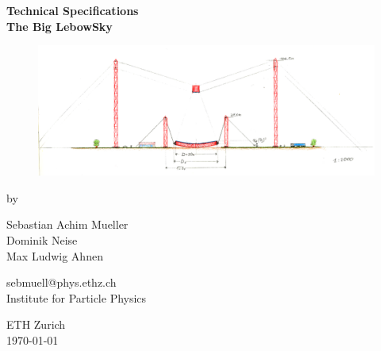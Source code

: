 \documentclass[11pt,a4paper,oneside,titlepage]{article}
\begin{document}
\newcommand{\CenFig}[2]{
    \begin{figure}[H]
        \begin{center}
            \texttt{[image: \#1]}
        \end{center}
    \end{figure}
}

\makeatletter
{}
\def\lst@SkipToFirst{%
    \lst@ifmatchrangestart\c@lstnumber=\numexpr-1+\lst@firstline\fi
    \ifnum \lst@lineno<\lst@firstline
        \def\lst@next{\lst@BeginDropInput\lst@Pmode
        \lst@Let{13}\lst@MSkipToFirst
        \lst@Let{10}\lst@MSkipToFirst}%
        \expandafter\lst@next
    \else
        \expandafter\lst@BOLGobble
    \fi}
\makeatother
\newcommand{\FigCapLabSca}[4]{
\begin{figure}[H]
    \begin{center}
        \texttt{[image: \#1]}
        \caption[]{#2}
        \label{#3}
    \end{center}
\end{figure}
}
%
\thispagestyle{empty}
\begin{center}
    \begin{huge}
        \textbf{Technical Specifications\\The Big LebowSky}
    \end{huge}
    \begin{figure}[H]
        \includegraphics[width=1.0\textwidth]{figures/lebowsky_drawing.png}
    \end{figure}
    \vfill
    by\\
    \begin{Large}
        Sebastian Achim Mueller\\Dominik Neise\\Max Ludwig Ahnen\\
    \end{Large}
    sebmuell@phys.ethz.ch\\
    \vspace{20pt}
    Institute for Particle Physics
    \par\smallskip\noindent
    ETH Zurich\\ \today \\ \currenttime
\end{center}
\end{document}
